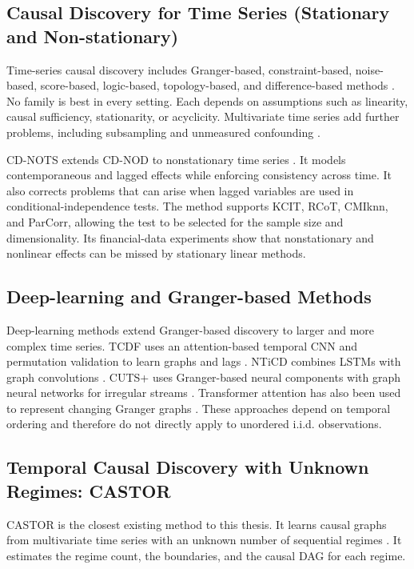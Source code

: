 \subsection{Causal Discovery for Time Series (Stationary and Non-stationary)}

Time-series causal discovery includes Granger-based, constraint-based, noise-based,
score-based, logic-based, topology-based, and difference-based methods
\cite{assaad2022survey}. No family is best in every setting. Each depends on
assumptions such as linearity, causal sufficiency, stationarity, or acyclicity.
Multivariate time series add further problems, including subsampling and unmeasured
confounding \cite{glymour2019review}.

CD-NOTS extends CD-NOD to nonstationary time series
\cite{sadeghi2025causal,huang2020causal}. It models contemporaneous and lagged
effects while enforcing consistency across time. It also corrects problems that can
arise when lagged variables are used in conditional-independence tests. The method
supports KCIT, RCoT, CMIknn, and ParCorr, allowing the test to be selected for the
sample size and dimensionality. Its financial-data experiments show that
nonstationary and nonlinear effects can be missed by stationary linear methods.

\subsection{Deep-learning and Granger-based Methods}
\label{ssec:granger}

Deep-learning methods extend Granger-based discovery to larger and more complex
time series. TCDF uses an attention-based temporal CNN and permutation validation
to learn graphs and lags \cite{nauta2019causal}. NTiCD combines LSTMs with graph
convolutions \cite{absar2023neural}. CUTS+ uses Granger-based neural components
with graph neural networks for irregular streams \cite{cheng2023cuts}. Transformer
attention has also been used to represent changing Granger graphs
\cite{zhu2025attention}. These approaches depend on temporal ordering and therefore
do not directly apply to unordered i.i.d. observations.

\subsection{Temporal Causal Discovery with Unknown Regimes: CASTOR}

CASTOR is the closest existing method to this thesis. It learns causal graphs from
multivariate time series with an unknown number of sequential regimes
\cite{rahmani2025castor}. It estimates the regime count, the boundaries, and the
causal DAG for each regime.

